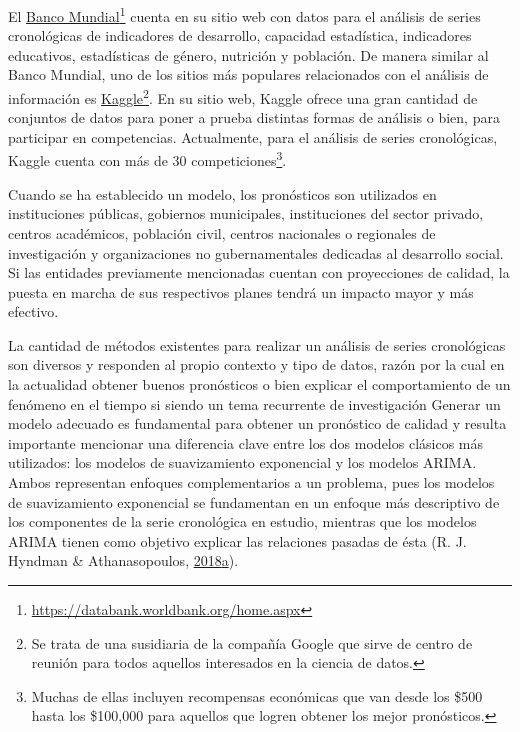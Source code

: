 \documentclass[
]{article}
\begin{document}
El \href{https://databank.worldbank.org/home.aspx}{Banco
Mundial}\footnote{\url{https://databank.worldbank.org/home.aspx}} cuenta
en su sitio web con datos para el análisis de series cronológicas de
indicadores de desarrollo, capacidad estadística, indicadores
educativos, estadísticas de género, nutrición y población. De manera
similar al Banco Mundial, uno de los sitios más populares relacionados
con el análisis de información es
\href{https://www.kaggle.com/}{Kaggle}\footnote{Se trata de una
  susidiaria de la compañía Google que sirve de centro de reunión para
  todos aquellos interesados en la ciencia de datos.}. En su sitio web,
Kaggle ofrece una gran cantidad de conjuntos de datos para poner a
prueba distintas formas de análisis o bien, para participar en
competencias. Actualmente, para el análisis de series cronológicas,
Kaggle cuenta con más de 30 competiciones\footnote{Muchas de ellas
  incluyen recompensas económicas que van desde los \$500 hasta los
  \$100,000 para aquellos que logren obtener los mejor pronósticos.}.

Cuando se ha establecido un modelo, los pronósticos son utilizados en
instituciones públicas, gobiernos municipales, instituciones del sector
privado, centros académicos, población civil, centros nacionales o
regionales de investigación y organizaciones no gubernamentales
dedicadas al desarrollo social. Si las entidades previamente mencionadas
cuentan con proyecciones de calidad, la puesta en marcha de sus
respectivos planes tendrá un impacto mayor y más efectivo.

La cantidad de métodos existentes para realizar un análisis de series
cronológicas son diversos y responden al propio contexto y tipo de
datos, razón por la cual en la actualidad obtener buenos pronósticos o
bien explicar el comportamiento de un fenómeno en el tiempo si siendo un
tema recurrente de investigación Generar un modelo adecuado es
fundamental para obtener un pronóstico de calidad y resulta importante
mencionar una diferencia clave entre los dos modelos clásicos más
utilizados: los modelos de suavizamiento exponencial y los modelos
ARIMA. Ambos representan enfoques complementarios a un problema, pues
los modelos de suavizamiento exponencial se fundamentan en un enfoque
más descriptivo de los componentes de la serie cronológica en estudio,
mientras que los modelos ARIMA tienen como objetivo explicar las
relaciones pasadas de ésta (R. J. Hyndman \& Athanasopoulos,
\protect\hyperlink{ref-hyndman2018forecasting}{2018}\protect\hyperlink{ref-hyndman2018forecasting}{a}).
\end{document}
